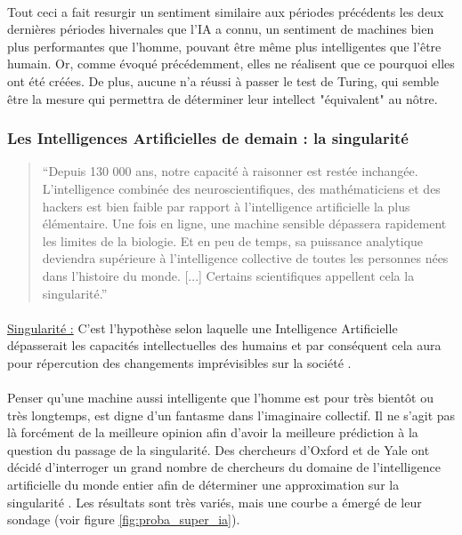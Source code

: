 \documentclass[10pt, french, a4paper]{report}
\begin{document}
\paragraph{}
Tout ceci a fait resurgir un sentiment similaire aux périodes précédents les deux dernières périodes hivernales que l’IA a connu, un sentiment de machines bien plus performantes que l’homme, pouvant être même plus intelligentes que l’être humain. Or, comme évoqué précédemment, elles ne réalisent que ce pourquoi elles ont été créées. De plus, aucune n’a réussi à passer le test de Turing, qui semble être la mesure qui permettra de déterminer leur intellect "équivalent" au nôtre.

\subsubsection{Les Intelligences Artificielles de demain : la singularité}

\begin{quotation}
``Depuis 130 000 ans, notre capacité à raisonner est restée inchangée. L'intelligence combinée des neuroscientifiques, des mathématiciens et des hackers est bien faible par rapport à l'intelligence artificielle la plus élémentaire. Une fois en ligne, une machine sensible dépassera rapidement les limites de la biologie. Et en peu de temps, sa puissance analytique deviendra supérieure à l'intelligence collective de toutes les personnes nées dans l'histoire du monde. [...] Certains scientifiques appellent cela la singularité.''
\end{quotation}

\paragraph{}
\underline{Singularité :} C'est l'hypothèse selon laquelle une Intelligence Artificielle dépasserait les capacités intellectuelles des humains et par conséquent cela aura pour répercution des changements imprévisibles sur la société \citep{eden_singularity_2013}.

\paragraph{}
Penser qu’une machine aussi intelligente que l’homme est pour très bientôt ou très longtemps, est digne d’un fantasme dans l’imaginaire collectif. Il ne s’agit pas là forcément de la meilleure opinion afin d’avoir la meilleure prédiction à la question du passage de la singularité. Des chercheurs d’Oxford et de Yale ont décidé d’interroger un grand nombre de chercheurs du domaine de l’intelligence artificielle du monde entier afin de déterminer une approximation sur la singularité \citep{grace_when_2017}. Les résultats sont très variés, mais une courbe a émergé de leur sondage (voir figure \ref{fig:proba_super_ia}).
\end{document}
